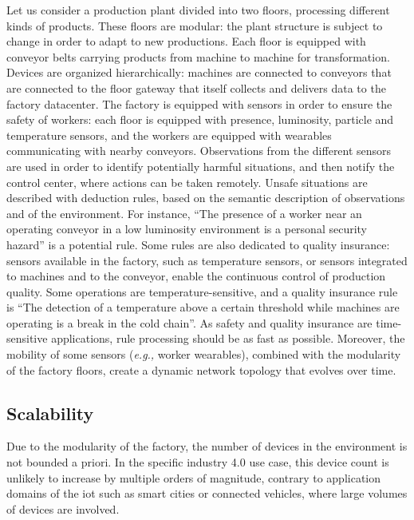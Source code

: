 \documentclass[sw]{iosart2x}
\begin{document}
Let us consider a production plant divided into two floors, processing different kinds of products. 
These floors are modular: the plant structure is subject to change in order to adapt to new productions.
Each floor is equipped with conveyor belts carrying products from machine to machine for transformation. 
Devices are organized hierarchically: machines are connected to conveyors that are connected to the floor gateway that itself collects and delivers data to the factory datacenter. 
The factory is equipped with sensors in order to ensure the safety of workers: each floor is equipped with presence, luminosity, particle and temperature sensors, and the workers are equipped with wearables communicating with nearby conveyors.
Observations from the different sensors are used in order to identify potentially harmful situations, and then notify the control center, where actions can be taken remotely.
Unsafe situations are described with deduction rules, based on the semantic description of observations and of the environment.
For instance, 
``The presence of a worker near an operating conveyor in a low luminosity environment is a personal security hazard'' is a potential rule.
Some rules are also dedicated to quality insurance: sensors available in the factory, such as temperature sensors, or sensors integrated to machines and to the conveyor, enable the continuous control of production quality.
Some operations are temperature-sensitive, and a quality insurance rule is ``The detection of a temperature above a certain threshold while machines are operating is a break in the cold chain''.
As safety and quality insurance are time-sensitive applications, rule processing should be as fast as possible.
Moreover, the mobility of some sensors (\textit{e.g.,} worker wearables), combined with the modularity of the factory floors, create a dynamic network topology that evolves over time.

\subsection{Scalability}

Due to the modularity of the factory, the number of devices in the environment is not bounded a priori. 
In the specific industry 4.0 use case, this device count is unlikely to increase by multiple orders of magnitude, contrary to application domains of the \gls{iot} such as smart cities or connected vehicles, where large volumes of devices are involved.
\end{document}
